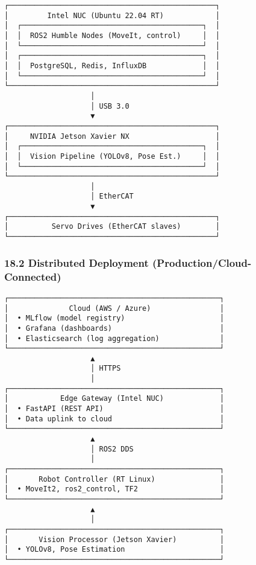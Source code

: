 \documentclass[
]{article}
\begin{document}
\begin{verbatim}
┌────────────────────────────────────────────────┐
│         Intel NUC (Ubuntu 22.04 RT)            │
│  ┌──────────────────────────────────────────┐  │
│  │  ROS2 Humble Nodes (MoveIt, control)     │  │
│  └──────────────────────────────────────────┘  │
│  ┌──────────────────────────────────────────┐  │
│  │  PostgreSQL, Redis, InfluxDB             │  │
│  └──────────────────────────────────────────┘  │
└────────────────────────────────────────────────┘
                    │
                    │ USB 3.0
                    ▼
┌────────────────────────────────────────────────┐
│     NVIDIA Jetson Xavier NX                    │
│  ┌──────────────────────────────────────────┐  │
│  │  Vision Pipeline (YOLOv8, Pose Est.)     │  │
│  └──────────────────────────────────────────┘  │
└────────────────────────────────────────────────┘
                    │
                    │ EtherCAT
                    ▼
┌────────────────────────────────────────────────┐
│          Servo Drives (EtherCAT slaves)        │
└────────────────────────────────────────────────┘
\end{verbatim}

\hypertarget{distributed-deployment-productioncloud-connected}{%
\subsubsection{18.2 Distributed Deployment
(Production/Cloud-Connected)}\label{distributed-deployment-productioncloud-connected}}

\begin{verbatim}
┌─────────────────────────────────────────────────┐
│              Cloud (AWS / Azure)                │
│  • MLflow (model registry)                      │
│  • Grafana (dashboards)                         │
│  • Elasticsearch (log aggregation)              │
└─────────────────────────────────────────────────┘
                    ▲
                    │ HTTPS
                    │
┌─────────────────────────────────────────────────┐
│            Edge Gateway (Intel NUC)             │
│  • FastAPI (REST API)                           │
│  • Data uplink to cloud                         │
└─────────────────────────────────────────────────┘
                    ▲
                    │ ROS2 DDS
                    │
┌─────────────────────────────────────────────────┐
│       Robot Controller (RT Linux)               │
│  • MoveIt2, ros2_control, TF2                   │
└─────────────────────────────────────────────────┘
                    ▲
                    │
┌─────────────────────────────────────────────────┐
│       Vision Processor (Jetson Xavier)          │
│  • YOLOv8, Pose Estimation                      │
└─────────────────────────────────────────────────┘
\end{verbatim}
\end{document}

